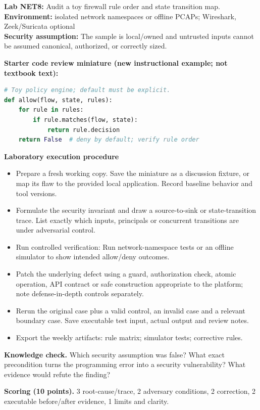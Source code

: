 \documentclass[10pt,letterpaper]{article}
\begin{document}
\begin{insight}\textbf{Lab NET8:} Audit a toy firewall rule order and state transition map.\\\textbf{Environment:} isolated network namespaces or offline PCAPs; Wireshark, Zeek/Suricata optional\\\textbf{Security assumption:} The sample is local/owned and untrusted inputs cannot be assumed canonical, authorized, or correctly sized.\end{insight}
\textbf{Starter code review miniature (new instructional example; not textbook text):}
\begin{lstlisting}[language=Python]
# Toy policy engine; default must be explicit.
def allow(flow, state, rules):
    for rule in rules:
        if rule.matches(flow, state):
            return rule.decision
    return False  # deny by default; verify rule order
\end{lstlisting}
\textbf{Laboratory execution procedure}
\begin{itemize}[leftmargin=*,itemsep=2pt]
\item Prepare a fresh working copy. Save the miniature as a discussion fixture, or map its flaw to the provided local application. Record baseline behavior and tool versions.
\item Formulate the security invariant and draw a source-to-sink or state-transition trace. List exactly which inputs, principals or concurrent transitions are under adversarial control.
\item Run controlled verification: Run network-namespace tests or an offline simulator to show intended allow/deny outcomes.
\item Patch the underlying defect using a guard, authorization check, atomic operation, API contract or safe construction appropriate to the platform; note defense-in-depth controls separately.
\item Rerun the original case plus a valid control, an invalid case and a relevant boundary case. Save executable test input, actual output and review notes.
\item Export the weekly artifacts: rule matrix; simulator tests; corrective rules.
\end{itemize}
\textbf{Knowledge check.} Which security assumption was false? What exact precondition turns the programming error into a security vulnerability? What evidence would refute the finding?

\textbf{Scoring (10 points).} 3 root-cause/trace, 2 adversary conditions, 2 correction, 2 executable before/after evidence, 1 limits and clarity.
\end{document}
